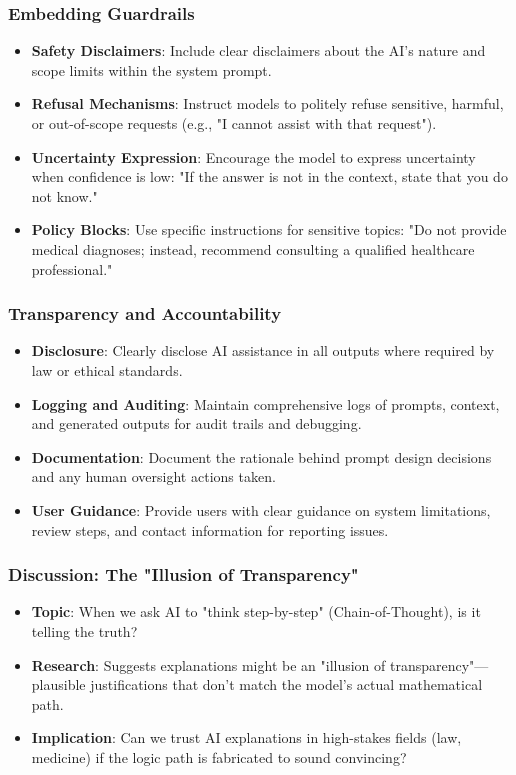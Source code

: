 \documentclass{beamer}
\begin{document}
\begin{frame}
    \frametitle{Embedding Guardrails}
    \begin{itemize}
        \item \textbf{Safety Disclaimers}: Include clear disclaimers about the AI's nature and scope limits within the system prompt.
        \item \textbf{Refusal Mechanisms}: Instruct models to politely refuse sensitive, harmful, or out-of-scope requests (e.g., "I cannot assist with that request").
        \item \textbf{Uncertainty Expression}: Encourage the model to express uncertainty when confidence is low: "If the answer is not in the context, state that you do not know."
        \item \textbf{Policy Blocks}: Use specific instructions for sensitive topics: "Do not provide medical diagnoses; instead, recommend consulting a qualified healthcare professional."
    \end{itemize}
\end{frame}

\begin{frame}
    \frametitle{Transparency and Accountability}
    \begin{itemize}
        \item \textbf{Disclosure}: Clearly disclose AI assistance in all outputs where required by law or ethical standards.
        \item \textbf{Logging and Auditing}: Maintain comprehensive logs of prompts, context, and generated outputs for audit trails and debugging.
        \item \textbf{Documentation}: Document the rationale behind prompt design decisions and any human oversight actions taken.
        \item \textbf{User Guidance}: Provide users with clear guidance on system limitations, review steps, and contact information for reporting issues.
    \end{itemize}
\end{frame}

\begin{frame}
    \frametitle{Discussion: The "Illusion of Transparency"}
    \begin{itemize}
        \item \textbf{Topic}: When we ask AI to "think step-by-step" (Chain-of-Thought), is it telling the truth?
        \item \textbf{Research}: Suggests explanations might be an "illusion of transparency"—plausible justifications that don't match the model's actual mathematical path.
        \item \textbf{Implication}: Can we trust AI explanations in high-stakes fields (law, medicine) if the logic path is fabricated to sound convincing?
    \end{itemize}
\end{frame}
\end{document}
